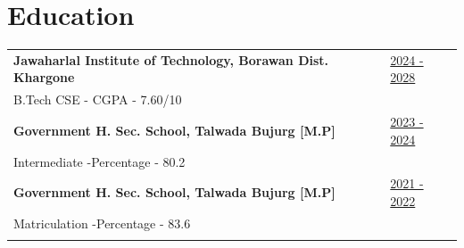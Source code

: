 \documentclass[a4paper,11pt]{article}
\begin{document}
\section{Education}
\begin{tabularx}{\linewidth}{@{}l X@{}}	
\textbf{Jawaharlal Institute of Technology, Borawan Dist. Khargone } & \hfill  \href{https://some-link.com}{2024 - 2028} \\[3.75pt]

B.Tech CSE - CGPA - 7.60/10 & \textbf \hfill \\ 

\textbf{Government H. Sec. School, Talwada Bujurg [M.P]}  & \hfill  \href{https://some-link.com}{2023 - 2024} \\[3.75pt]

\textnormal{Intermediate -Percentage - 80.2} \hfill  \\
\textbf{Government H. Sec. School, Talwada Bujurg [M.P]}  & \hfill  \href{https://some-link.com}{2021 - 2022} \\[3.75pt]

\textnormal{Matriculation -Percentage - 83.6}\hfill  \\
\noindent %
\end{tabularx}

\vspace{-13pt}
\end{document}

